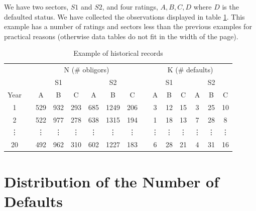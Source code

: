 \documentclass[11pt,fleqn]{book} %
\begin{document}
\begin{example}[]
	We have two sectors, $S1$ and $S2$, and four ratings, $A, B, C, D$ where 
	$D$ is the defaulted status. We have collected the observations displayed
	in table \ref{table:histdata}.
	This example has a number of ratings and sectors less than the previous 
	examples for practical reasons (otherwise data tables do not fit 
	in the width of the page).
	\begin{table}[h!]
		\centering
		\begin{tabular}{cc|c|c|c||c|c|c|  c  |c|c|c||c|c|c|}
			\cline{3-8} \cline{10-15}
			& & \multicolumn{6}{|c|}{N (\# obligors)} & & \multicolumn{6}{|c|}{K (\# defaults)} \\
			\cline{3-8} \cline{10-15}
			& & \multicolumn{3}{|c||}{S1} & \multicolumn{3}{|c|}{S2} & & \multicolumn{3}{|c||}{S1} & \multicolumn{3}{|c|}{S2} \\
			\cline{1-1} \cline{3-8} \cline{10-15}
			\multicolumn{1}{|c|}{Year} & & A & B & C & A & B & C & & A & B & C & A & B & C \\
			\cline{1-1} \cline{3-8} \cline{10-15}
			\multicolumn{1}{|c|}{1} & & 529 & 932 & 293 & 685 & 1249 & 206 & & 3 & 12 & 15 & 3 & 25 & 10 \\
			\cline{1-1} \cline{3-8} \cline{10-15}
			\multicolumn{1}{|c|}{2} & & 522 & 977 & 278 & 638 & 1315 & 194 & & 1 & 18 & 13 & 7 & 28 & 8 \\
			\cline{1-1} \cline{3-8} \cline{10-15}
			\multicolumn{1}{|c|}{\vdots} & & \vdots & \vdots & \vdots & \vdots & \vdots & \vdots & & \vdots & \vdots & \vdots & \vdots & \vdots & \vdots \\
			\cline{1-1} \cline{3-8} \cline{10-15}
			\multicolumn{1}{|c|}{20} & & 492 & 962 & 310 & 602 & 1227 & 183 & & 6 & 28 & 21 & 4 & 31 & 16 \\
			\cline{1-1} \cline{3-8} \cline{10-15}
		\end{tabular}
		\caption{Example of historical records}
		\label{table:histdata}
	\end{table}
\end{example}

\section{Distribution of the Number of Defaults}
\end{document}
